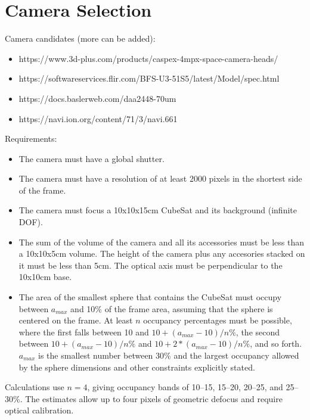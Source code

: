 \documentclass{article}
\begin{document}
\section{Camera Selection}

Camera candidates (more can be added):
\begin{itemize}
\item https://www.3d-plus.com/products/caspex-4mpx-space-camera-heads/
\item https://softwareservices.flir.com/BFS-U3-51S5/latest/Model/spec.html
\item https://docs.baslerweb.com/daa2448-70um
\item https://navi.ion.org/content/71/3/navi.661
\end{itemize}

Requirements:
\begin{itemize}
\item The camera must have a global shutter.
\item The camera must have a resolution of at least 2000 pixels in the shortest side of the frame.
\item The camera must focus a 10x10x15cm CubeSat and its background (infinite DOF).
\item The sum of the volume of the camera and all its accessories must be less than a 10x10x5cm volume. The height of the camera plus any accesories stacked on it must be less than 5cm. The optical axis must be perpendicular to the 10x10cm base.
\item The area of the smallest sphere that contains the CubeSat must occupy between $a_{max}$ and 10\% of the frame area, assuming that the sphere is centered on the frame. At least $n$ occupancy percentages must be possible, where the first falls between 10 and $10+(a_{max}-10)/n\%$, the second between $10+(a_{max}-10)/n\%$ and $10+2*(a_{max}-10)/n\%$, and so forth. $a_{max}$ is the smallest number between 30\% and the largest occupancy allowed by the sphere dimensions and other constraints explicitly stated.
\end{itemize}

Calculations use $n=4$, giving occupancy bands of 10--15, 15--20, 20--25, and 25--30\%. The estimates allow up to four pixels of geometric defocus and require optical calibration.
\end{document}
